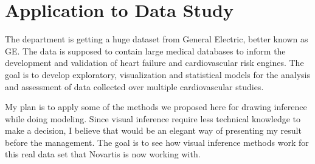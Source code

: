 \documentclass[12]{report}
\begin{document}
%
%


\chapter{Application to Data Study} \label{ch:application} The department is getting a huge dataset from General Electric, better known as GE. The data is supposed to contain large medical databases to inform the development and validation of heart failure and cardiovascular risk engines. The goal is to develop exploratory, visualization and statistical models for the analysis and assessment of data collected over multiple cardiovascular studies. 

My plan is to apply some of the methods we proposed here for drawing inference while doing modeling. Since visual inference require less technical knowledge to make a decision, I believe that would be an elegant way of presenting my result before the management. The goal is to see how visual inference methods work for this real data set that Novartis is now working with. 
\end{document}
